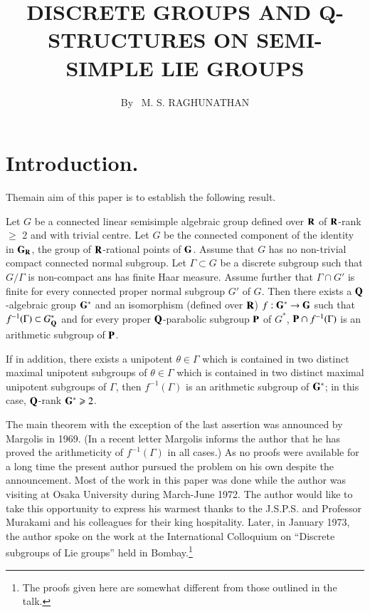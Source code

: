 \title{DISCRETE GROUPS AND Q-STRUCTURES ON SEMI-SIMPLE LIE GROUPS}

\author{By~ M. S. RAGHUNATHAN}

\date{}
\maketitle


\setcounter{pageoriginal}{224}

\section*{Introduction.} The\pageoriginale main aim of this paper is to establish the following result.

\begin{maintheorem*}
Let $G$ be a connected linear semisimple algebraic group defined over $\mathbf{R}$ of $\mathbf{R}$-rank $\geqslant$ 2 and with trivial centre. Let $G$ be the connected component of the identity in $\mathbf{G}_{\mathbf{R}}$, the group of $\mathbf{R}$-rational points of $\mathbf{G}$. Assume that $G$ has no non-trivial compact connected normal subgroup. Let $\Gamma \subset G$ be a discrete subgroup such that $G/\Gamma$ is non-compact ans has finite Haar measure. Assume further that $\Gamma \cap G'$ is finite for every connected proper normal subgroup $G'$ of $G$. Then there exists a $\mathbf{Q}$-algebraic group $\mathbf{G}^\ast$ and an isomorphism (defined over $\mathbf{R}$)  $f: \mathbf{G}^\ast \to \mathbf{G}$ such that $f^{-1} (\Gamma) \subset G^\ast_{\mathbf{Q}}$ and for every proper $\mathbf{Q}$-parabolic subgroup $\mathbf{P}$ of $G^\ast$, $\mathbf{P} \cap f^{-1} (\Gamma)$ is an arithmetic subgroup of $\mathbf{P}$.

If in addition, there exists a unipotent $\theta \in \Gamma$ which is contained in two distinct maximal unipotent subgroups of $\theta \in \Gamma$ which is contained in two distinct maximal unipotent subgroups of $\Gamma$, then $f^{-1}(\Gamma)$ is an arithmetic subgroup of $\mathbf{G}^\ast$; in this case, $\mathbf{Q}$-rank $\mathbf{G}^\ast \geqslant 2$.
\end{maintheorem*}

The main theorem with the exception of the last assertion was announced by Margolis \cite{art9-margolis-1} in 1969. (In a recent letter Margolis informs the author that he has proved the arithmeticity of $f^{-1}(\Gamma)$ in all cases.) As no proofs were available for a long time the present author pursued the problem on his own despite the announcement. Most of the work in this paper was done while the author was visiting at Osaka University during March-June 1972. The author would like to take this opportunity to express his warmest thanks to the J.S.P.S. and Professor Murakami and his colleagues for their king hospitality. Later, in January 1973, the author spoke on the work at the International Colloquium on ``Discrete subgroups of Lie groups'' held in Bombay.\footnote{The proofs given here are somewhat different from those outlined in the talk.}

